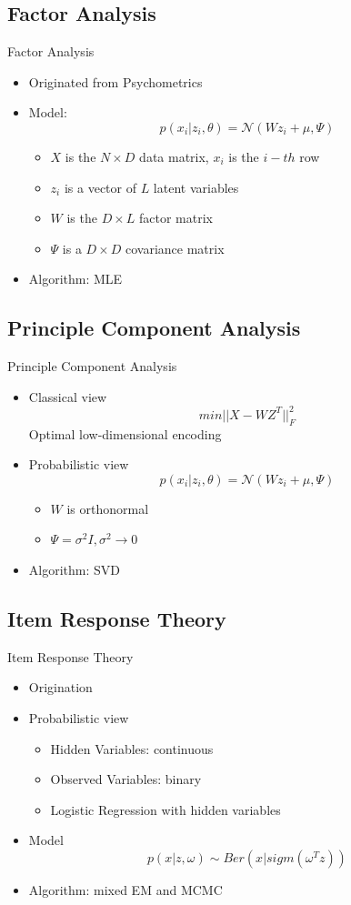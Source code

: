 \documentclass[handout]{beamer}
\begin{document}
\subsection[FA]{Factor Analysis}
\begin{frame}{Factor Analysis}
\begin{itemize}
\item{Originated from Psychometrics}
\item{Model:
$$p(x_i|z_i,\theta)=\mathscr{N}(Wz_i+\mu,\Psi)$$}
\begin{itemize}
\item{$X$ is the $N \times D$ data matrix, $x_i$ is the $i-th$ row}
\item{$z_i$ is a vector of $L$ latent variables}
\item{$W$ is the $D \times L$ factor matrix}
\item{$\Psi$ is a $D \times D$ covariance matrix}
\end{itemize}
\item{Algorithm: MLE}
\end{itemize}
\end{frame}

\subsection[PCA]{Principle Component Analysis}
\begin{frame}{Principle Component Analysis}
\begin{itemize}
\item{Classical view}
$$min ||X-WZ^T||_F^2$$
Optimal low-dimensional encoding 
\item{Probabilistic view}
$$p(x_i|z_i,\theta)=\mathscr{N}(Wz_i+\mu,\Psi)$$
\begin{itemize}
\item{$W$ is orthonormal}
\item{$\Psi = \sigma^2I, \sigma^2\rightarrow 0$}
\end{itemize}
\item{Algorithm: SVD}
\end{itemize}
\end{frame}

\subsection[IRT]{Item Response Theory}
\begin{frame}{Item Response Theory}
\begin{itemize}
\item{Origination}
\item{Probabilistic view}
\begin{itemize}
\item{Hidden Variables: continuous}
\item{Observed Variables: binary}
\item{Logistic Regression with hidden variables}
\end{itemize}
\item{Model}
$$ p(x|z,\omega) \sim Ber(x|sigm(\omega^Tz)) $$
\item{Algorithm: mixed EM and MCMC}
\end{itemize}
\end{frame}
\end{document}
